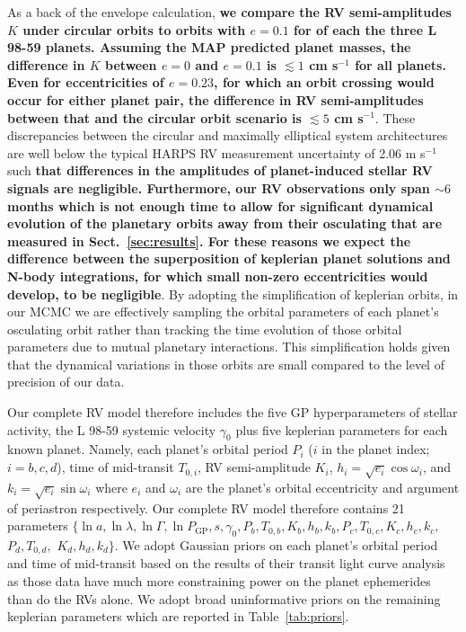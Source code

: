 \documentclass[longauth]{aa}
\newcommand{\mps}{m s$^{-1}$}
\begin{document}
As a back of the envelope calculation, \textbf{we compare the RV semi-amplitudes $K$ under circular orbits to orbits with $e=0.1$ for of each the three L 98-59 planets. Assuming the MAP predicted planet masses, the difference in $K$ between $e=0$ and $e=0.1$ is $\lesssim 1$ cm s$^{-1}$ for all planets. Even for eccentricities of $e=0.23$, for which an orbit crossing would occur for either planet pair, the difference in RV semi-amplitudes between that and the circular orbit scenario is $\lesssim 5$ cm s$^{-1}$}. These discrepancies between the circular and maximally elliptical system architectures are well below the typical HARPS RV measurement uncertainty of 2.06 \mps{} such \textbf{that differences in the amplitudes of planet-induced stellar RV signals are negligible. Furthermore, our RV observations only span $\sim 6$ months which is not enough time to allow for significant dynamical evolution of the planetary orbits away from their osculating that are measured in Sect.~\ref{sec:results}. For these reasons we expect the difference between the superposition of keplerian planet solutions and N-body integrations, for which small non-zero eccentricities would develop, to be negligible}. By adopting the simplification of keplerian orbits, in our MCMC we are effectively sampling the orbital parameters of each planet's osculating orbit rather than tracking the time evolution of those orbital parameters due to mutual planetary interactions. This simplification holds given that the dynamical variations in those orbits are small compared to the level of precision of our data.

Our complete RV model therefore includes the five GP hyperparameters of stellar activity, the L 98-59 systemic velocity $\gamma_0$ plus five keplerian parameters for each known planet. Namely, each planet's orbital period $P_i$ ($i$ in the planet index; $i=b,c,d$), time of mid-transit $T_{0,i}$, RV semi-amplitude $K_i$, $h_i=\sqrt{e_i}\cos{\omega_i}$, and $k_i=\sqrt{e_i}\sin{\omega_i}$ \citep{ford06} where $e_i$ and $\omega_i$ are the planet's orbital eccentricity and argument of periastron respectively. Our complete RV model therefore contains 21 parameters $\{\ln{a}, \ln{\lambda}, \ln{\Gamma}, \ln{P_{\text{GP}}}, s, \gamma_0, P_b, T_{0,b}, K_b, h_b, k_b, P_c, T_{0,c}, K_c, h_c, k_c,$ $P_d, T_{0,d},$ $K_d, h_d, k_d \}$. We adopt Gaussian priors on each planet's orbital period and time of mid-transit based on the results of their transit light curve analysis  as those data have much more constraining power on the planet ephemerides than do the RVs alone. We adopt broad uninformative priors on the remaining keplerian parameters which are reported in Table~\ref{tab:priors}.
\end{document}
